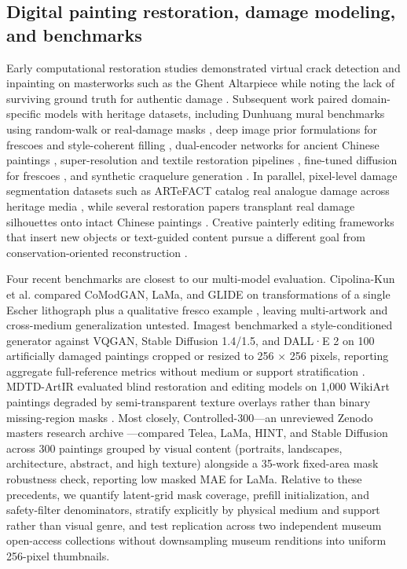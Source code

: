 \documentclass[fleqn,12pt,lineno]{wlpeerj}
\begin{document}
\subsection{Digital painting restoration, damage modeling, and benchmarks}\label{digital-painting-restoration-damage-modeling-and-benchmarks}

Early computational restoration studies demonstrated virtual crack detection and inpainting on masterworks such as the Ghent Altarpiece while noting the lack of surviving ground truth for authentic damage \citep{cornelis2013}. Subsequent work paired domain-specific models with heritage datasets, including Dunhuang mural benchmarks using random-walk or real-damage masks \citep{yu2019dunhuang, shao2023, xu2024dunhuang}, deep image prior formulations for frescoes and style-coherent filling \citep{merizzi2024, morotti2024}, dual-encoder networks for ancient Chinese paintings \citep{sun2024}, super-resolution and textile restoration pipelines \citep{hu2024, wang2024silk}, fine-tuned diffusion for frescoes \citep{smolka2025}, and synthetic craquelure generation \citep{cuchguillen2026}. In parallel, pixel-level damage segmentation datasets such as ARTeFACT catalog real analogue damage across heritage media \citep{ivanova2024artefact}, while several restoration papers transplant real damage silhouettes onto intact Chinese paintings \citep{zhang2026inkrenew, xue2025}. Creative painterly editing frameworks that insert new objects or text-guided content pursue a different goal from conservation-oriented reconstruction \citep{xu2023refpaint, fanelli2024}.

Four recent benchmarks are closest to our multi-model evaluation. Cipolina-Kun et al. compared CoModGAN, LaMa, and GLIDE on transformations of a single Escher lithograph plus a qualitative fresco example \citep{cipolinakun2022}, leaving multi-artwork and cross-medium generalization untested. Imagest benchmarked a style-conditioned generator against VQGAN, Stable Diffusion 1.4/1.5, and DALL·E 2 on 100 artificially damaged paintings cropped or resized to 256 \ensuremath{\times} 256 pixels, reporting aggregate full-reference metrics without medium or support stratification \citep{hu2025imagest}. MDTD-ArtIR evaluated blind restoration and editing models on 1,000 WikiArt paintings degraded by semi-transparent texture overlays rather than binary missing-region masks \citep{vijendran2026}. Most closely, Controlled-300---an unreviewed Zenodo master\textquotesingle s research archive \citep{controlled300}---compared Telea, LaMa, HINT, and Stable Diffusion across 300 paintings grouped by visual content (portraits, landscapes, architecture, abstract, and high texture) alongside a 35-work fixed-area mask robustness check, reporting low masked MAE for LaMa. Relative to these precedents, we quantify latent-grid mask coverage, prefill initialization, and safety-filter denominators, stratify explicitly by physical medium and support rather than visual genre, and test replication across two independent museum open-access collections without downsampling museum renditions into uniform 256-pixel thumbnails.
\end{document}

